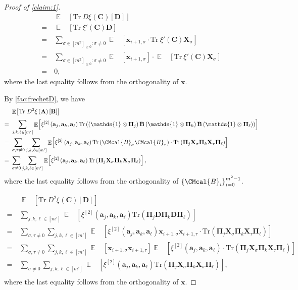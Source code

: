 \documentclass[10pt,a4paper]{article}
\def\B{\CMcal{B}}
\theoremstyle{plain}
\theoremstyle{definition}
\newcommand {\minusspace} {\: \! \!}
\newcommand {\Fn} [2] {\ensuremath{ #1 \minusspace \Br{ #2 } }}
\newcommand {\set} [1] {\ensuremath{ \left\lbrace #1 \right\rbrace }}
\newcommand {\br} [1] {\ensuremath{ \left( #1 \right) }}
\newcommand {\Br} [1] {\ensuremath{ \left[ #1 \right] }}
\DeclareMathOperator*{\bigE}{\mathbb{E}}
\newcommand {\expec} [2] {\Fn{\bigE_{\substack{#1}}}{#2}}
\newcommand {\Tr} {\ensuremath{ \mathrm{Tr} }}
\newcommand {\id} {\ensuremath{\mathds{1}}}
\newcommand{\randx}{\ensuremath{\mathbf{x}}}
\newcommand{\randB}{\ensuremath{\mathbf{B}}}
\newcommand{\randC}{\ensuremath{\mathbf{C}}}
\newcommand{\randD}{\ensuremath{\mathbf{D}}}
\newcommand{\randa}{\ensuremath{\mathbf{a}}}
\newcommand{\randPi}{\ensuremath{\mathbf{\Pi}}}
\newcommand{\1}{\mathbb{1}} %
\begin{document}
\begin{proof}[Proof of \cref{claim:1}]
\begin{align*}
&\expec{}{\Tr~D\xi\br{\mathbf{C}}\Br{\mathbf{D}}}\\
=~&\expec{}{\Tr~\xi'\br{\randC}\randD}\\
=~&\sum_{\sigma\in[m^2]_{\geq 0}:\sigma\neq 0}\expec{}{\randx_{i+1,\sigma}\cdot\Tr~\xi'\br{\randC}\mathbf{X}_{\sigma}}\\
=~&\sum_{\sigma\in[m^2]_{\geq 0}:\sigma\neq 0}\expec{}{\randx_{i+1,\sigma}}\cdot\expec{}{\Tr~\xi'\br{\randC}\mathbf{X}_{\sigma}}\\
=~&0,
\end{align*}
where the last equality follows from the orthogonality of $\randx$.


By \cref{fac:frechetD}, we have 
\begin{align*}
&\expec{}{\Tr~D^2\xi\br{\mathbf{A}}\Br{\mathbf{B}}}\\
=~&\sum_{j,k,\ell\in[m']}\expec{}{\xi^{[2]}\br{\randa_j,\randa_k,\randa_{\ell}}\Tr\br{\br{\id\otimes\randPi_{j}}\randB\br{\id\otimes\randPi_{k}}\randB\br{\id\otimes\randPi_{\ell}}}}\\
=~&\sum_{\sigma,\tau\ne0}\sum_{j,k,\ell\in[m']}\expec{}{\xi^{[2]}\br{\randa_j,\randa_k,\randa_{\ell}}\Tr\br{\B_{\sigma}\B_{\tau}}\cdot\Tr\br{\randPi_{j}\mathbf{X}_{\sigma}\randPi_{k}\mathbf{X}_{\tau}\randPi_{\ell}}}\\
=~&\sum_{\sigma\ne0}\sum_{j,k,\ell\in[m']}\expec{}{\xi^{[2]}\br{\randa_j,\randa_k,\randa_{\ell}}\Tr\br{\randPi_{j}\mathbf{X}_{\sigma}\randPi_{k}\mathbf{X}_{\sigma}\randPi_{\ell}}},\\
\end{align*}
where the last equality follows from the orthogonality of $\set{\B_i}_{i=0}^{m^2-1}$.


\begin{align*}
&\expec{}{\Tr~D^2\xi\br{\mathbf{C}}\Br{\mathbf{D}}}\\
=~&\sum_{j,k,\ell\in[m']}\expec{}{\xi^{[2]}\br{\randa_j,\randa_k,\randa_{\ell}}\Tr\br{\randPi_{j}\randD\randPi_{k}\randD\randPi_{\ell}}}\\
=~&\sum_{\sigma,\tau\ne0}\sum_{j,k,\ell\in[m']}\expec{}{\xi^{[2]}\br{\randa_j,\randa_k,\randa_{\ell}}\randx_{i+1,\sigma}\randx_{i+1,\tau}\cdot\Tr\br{\randPi_{j}\mathbf{X}_{\sigma}\randPi_{k}\mathbf{X}_{\tau}\randPi_{\ell}}}\\
=~&\sum_{\sigma,\tau\ne0}\sum_{j,k,\ell\in[m']}\expec{}{\randx_{i+1,\sigma}\randx_{i+1,\tau}}\expec{}{\xi^{[2]}\br{\randa_j,\randa_k,\randa_{\ell}}\cdot\Tr\br{\randPi_{j}\mathbf{X}_{\sigma}\randPi_{k}\mathbf{X}_{\tau}\randPi_{\ell}}}\\
=~&\sum_{\sigma\ne0}\sum_{j,k,\ell\in[m']}\expec{}{\xi^{[2]}\br{\randa_j,\randa_k,\randa_{\ell}}\Tr\br{\randPi_{j}\mathbf{X}_{\sigma}\randPi_{k}\mathbf{X}_{\sigma}\randPi_{\ell}}},\\
\end{align*}
where the last equality follows from the orthogonality of $\randx$.
\end{proof}
\end{document}
